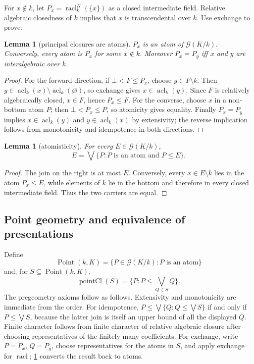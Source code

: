 \documentclass[11pt,oneside]{article}
\newtheorem{lemma}[theorem]{Lemma}
\theoremstyle{definition}
\theoremstyle{remark}
\newcommand{\acl}{\operatorname{acl}}
\newcommand{\G}{\mathcal{G}}
\begin{document}
For $x\notin k$, let $P_x=\operatorname{racl}_k^K(\{x\})$ as a closed intermediate
field.  Relative algebraic closedness of $k$ implies that $x$ is transcendental over $k$.
Use exchange to prove:

\begin{lemma}[principal closures are atoms]\label{lem:principal-atom}
$P_x$ is an atom of $\G(K/k)$.  Conversely, every atom is $P_x$ for some $x\notin k$.
Moreover $P_x=P_y$ iff $x$ and $y$ are interalgebraic over $k$.
\end{lemma}
\begin{proof}
For the forward direction, if $\bot<F\leq P_x$, choose $y\in F\setminus k$.
Then $y\in\acl_k(x)\setminus\acl_k(\varnothing)$, so exchange gives
$x\in\acl_k(y)$.  Since $F$ is relatively algebraically closed, $x\in F$, hence
$P_x\leq F$.  For the converse, choose $x$ in a non-bottom atom $P$; then
$\bot<P_x\leq P$, so atomicity gives equality.
Finally $P_x=P_y$ implies $x\in\acl_k(y)$ and $y\in\acl_k(x)$ by extensivity; the
reverse implication follows from monotonicity and idempotence in both directions.
\end{proof}

\begin{lemma}[atomisticity]\label{lem:atomistic}
For every $E\in\G(K/k)$,
\[
  E=\bigvee\{P:P\text{ is an atom and }P\leq E\}.
\]
\end{lemma}
\begin{proof}
The join on the right is at most $E$.  Conversely, every $x\in E\setminus k$ lies in
the atom $P_x\leq E$, while elements of $k$ lie in the bottom and therefore in every
closed intermediate field.  Thus the two carriers are equal.
\end{proof}

\subsection{Point geometry and equivalence of presentations}

Define
\[
  \operatorname{Point}(k,K)=\{P\in\G(K/k):P\text{ is an atom}\}
\]
and, for $S\subseteq\operatorname{Point}(k,K)$,
\[
  \operatorname{pointCl}(S)=\{P:P\leq\bigvee_{Q\in S}Q\}.
\]
The pregeometry axioms follow as follows.  Extensivity and monotonicity are immediate from
the order.  For idempotence,
$P\leq\bigvee\{Q:Q\leq\bigvee S\}$ if and only if $P\leq\bigvee S$, because the latter
join is itself an upper bound of all the displayed $Q$.  Finite character follows from
finite character of relative algebraic closure after choosing representatives of the
finitely many coefficients.  For exchange, write $P=P_x$, $Q=P_y$, choose
representatives for the atoms in $S$, and apply exchange for
$\operatorname{racl}$; \cref{lem:principal-atom} converts the result back to atoms.
\end{document}
